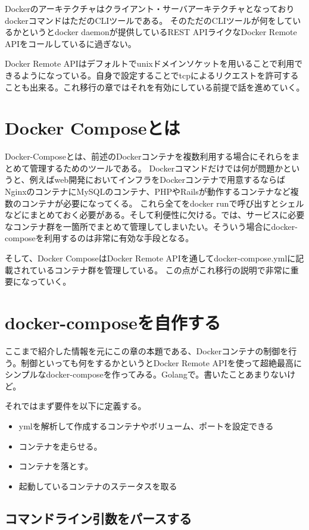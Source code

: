 Dockerのアーキテクチャはクライアント・サーバアーキテクチャとなっておりdockerコマンドはただのCLIツールである。
そのただのCLIツールが何をしているかというとdocker daemonが提供しているREST APIライクなDocker Remote APIをコールしているに過ぎない。


Docker Remote APIはデフォルトでunixドメインソケットを用いることで利用できるようになっている。自身で設定することでtcpによるリクエストを許可することも出来る。これ移行の章ではそれを有効にしている前提で話を進めていく。

\section{Docker Composeとは}

Docker-Composeとは、前述のDockerコンテナを複数利用する場合にそれらをまとめて管理するためのツールである。
Dockerコマンドだけでは何が問題かというと、例えばweb開発においてインフラをDockerコンテナで用意するならばNginxのコンテナにMySQLのコンテナ、PHPやRailsが動作するコンテナなど複数のコンテナが必要になってくる。
これら全てをdocker runで呼び出すとシェルなどにまとめておく必要がある。そして利便性に欠ける。では、サービスに必要なコンテナ群を一箇所でまとめて管理してしまいたい。そういう場合にdocker-composeを利用するのは非常に有効な手段となる。


そして、Docker ComposeはDocker Remote APIを通してdocker-compose.ymlに記載されているコンテナ群を管理している。
この点がこれ移行の説明で非常に重要になっていく。

\section{docker-composeを自作する}

ここまで紹介した情報を元にこの章の本題である、Dockerコンテナの制御を行う。制御といっても何をするかというとDocker Remote APIを使って超絶最高にシンプルなdocker-composeを作ってみる。Golangで。書いたことあまりないけど。


それではまず要件を以下に定義する。
\begin{itemize}
    \item ymlを解析して作成するコンテナやボリューム、ポートを設定できる
    \item コンテナを走らせる。
    \item コンテナを落とす。
    \item 起動しているコンテナのステータスを取る
\end{itemize}

\subsection{コマンドライン引数をパースする}

